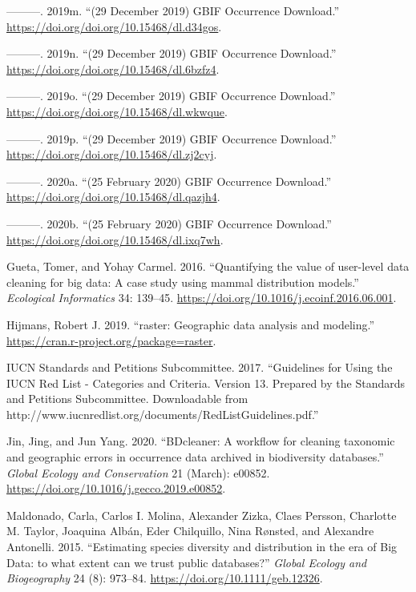 \documentclass[fleqn,10pt,lineno]{wlpeerj} %
\begin{document}
\leavevmode\hypertarget{ref-GBIForg2019l}{}%
---------. 2019m. ``(29 December 2019) GBIF Occurrence Download.'' \url{https://doi.org/doi.org/10.15468/dl.d34gos}.

\leavevmode\hypertarget{ref-GBIForg2019m}{}%
---------. 2019n. ``(29 December 2019) GBIF Occurrence Download.'' \url{https://doi.org/doi.org/10.15468/dl.6bzfz4}.

\leavevmode\hypertarget{ref-GBIForg2019n}{}%
---------. 2019o. ``(29 December 2019) GBIF Occurrence Download.'' \url{https://doi.org/doi.org/10.15468/dl.wkwque}.

\leavevmode\hypertarget{ref-GBIForg2019o}{}%
---------. 2019p. ``(29 December 2019) GBIF Occurrence Download.'' \url{https://doi.org/doi.org/10.15468/dl.zj2cyj}.

\leavevmode\hypertarget{ref-GBIForg2020}{}%
---------. 2020a. ``(25 February 2020) GBIF Occurrence Download.'' \url{https://doi.org/doi.org/10.15468/dl.qazjh4}.

\leavevmode\hypertarget{ref-GBIForg2020a}{}%
---------. 2020b. ``(25 February 2020) GBIF Occurrence Download.'' \url{https://doi.org/doi.org/10.15468/dl.ixq7wh}.

\leavevmode\hypertarget{ref-Gueta2016}{}%
Gueta, Tomer, and Yohay Carmel. 2016. ``Quantifying the value of user-level data cleaning for big data: A case study using mammal distribution models.'' \emph{Ecological Informatics} 34: 139--45. \url{https://doi.org/10.1016/j.ecoinf.2016.06.001}.

\leavevmode\hypertarget{ref-Hijmans2019}{}%
Hijmans, Robert J. 2019. ``raster: Geographic data analysis and modeling.'' \url{https://cran.r-project.org/package=raster}.

\leavevmode\hypertarget{ref-IUCN2017}{}%
IUCN Standards and Petitions Subcommittee. 2017. ``Guidelines for Using the IUCN Red List - Categories and Criteria. Version 13. Prepared by the Standards and Petitions Subcommittee. Downloadable from http://www.iucnredlist.org/documents/RedListGuidelines.pdf.''

\leavevmode\hypertarget{ref-Jin2020}{}%
Jin, Jing, and Jun Yang. 2020. ``BDcleaner: A workflow for cleaning taxonomic and geographic errors in occurrence data archived in biodiversity databases.'' \emph{Global Ecology and Conservation} 21 (March): e00852. \url{https://doi.org/10.1016/j.gecco.2019.e00852}.

\leavevmode\hypertarget{ref-Maldonado2015}{}%
Maldonado, Carla, Carlos I. Molina, Alexander Zizka, Claes Persson, Charlotte M. Taylor, Joaquina Albán, Eder Chilquillo, Nina Rønsted, and Alexandre Antonelli. 2015. ``Estimating species diversity and distribution in the era of Big Data: to what extent can we trust public databases?'' \emph{Global Ecology and Biogeography} 24 (8): 973--84. \url{https://doi.org/10.1111/geb.12326}.
\end{document}
